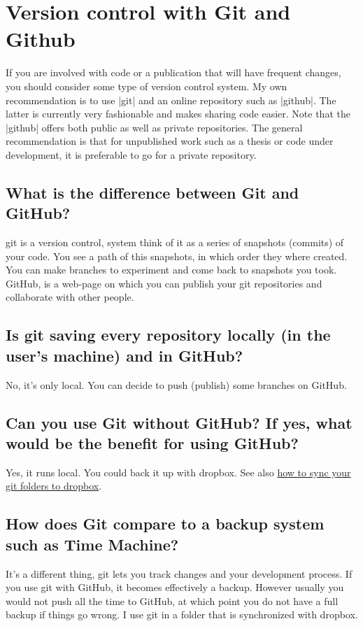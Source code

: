  \section{Version control with Git and Github}
 If you are involved with code or a publication that will have frequent changes, you should consider
 some type of version control system. My own recommendation is to use |git| and an online repository such
 as |github|. The latter is currently very fashionable and makes sharing code easier. Note that the |github|
 offers both public as well as private repositories. The general recommendation is that for unpublished work
 such as a thesis or code under development, it is preferable to go for a private repository. 
 
 \subsection*{What is the difference between Git and GitHub?}
git is a version control, system think of it as a series of snapshots (commits) of your code. You see 
a path of this snapshots, in which order they where created. You can make branches to experiment and come back to snapshots you took.
GitHub, is a web-page on which you can publish your git repositories and collaborate with other people.

 \subsection*{Is git saving every repository locally (in the user's machine) and in GitHub?}

 No, it's only local. You can decide to push (publish) some branches on GitHub.

 \subsection*{Can you use Git without GitHub? If yes, what would be the benefit for using GitHub?}

 Yes, it runs local. You could back it up with dropbox. See also \href{http://dotmonster.co/backup-and-sync-folders-with-dropbox-and-symbolic-links/}{how to sync your git folders to dropbox}.

\subsection*{How does Git compare to a backup system such as Time Machine?}

It's a different thing, git lets you track changes and your development process. If you use git with GitHub, it becomes effectively a backup. However usually you would not push all the time to GitHub, at which point you do not have a full backup if things go wrong. I use git in a folder that is synchronized with dropbox.

